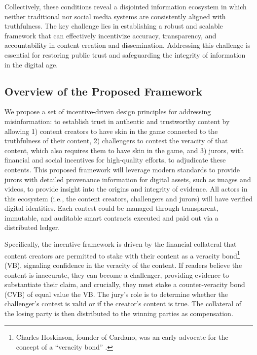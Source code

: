 \documentclass{article}
\begin{document}
Collectively, these conditions reveal a disjointed information ecosystem in which neither traditional nor social media systems are consistently aligned with truthfulness. The key challenge lies in establishing a robust and scalable framework that can effectively incentivize accuracy, transparency, and accountability in content creation and dissemination. Addressing this challenge is essential for restoring public trust and safeguarding the integrity of information in the digital age.

\subsection{Overview of the Proposed Framework}


We propose a set of incentive-driven design principles for addressing \gls{misinformation}: to establish trust in authentic and trustworthy content by allowing 1) content \gls{creators} to have skin in the game connected to the truthfulness of their content, 2) \gls{challengers} to \gls{contest} the veracity of that content, which also requires them to have skin in the game, and 3) \gls{jurors}, with financial and social incentives for high-quality efforts, to adjudicate these contents. This proposed framework will leverage modern standards \cite{c2pa} to provide jurors with detailed provenance information for digital assets, such as images and videos, to provide insight into the origins and integrity of evidence. All actors in this ecosystem (i.e., the content creators, challengers and jurors) will have verified digital identities. Each contest could be managed through transparent, immutable, and auditable smart contracts executed and paid out via a distributed ledger.

Specifically, the incentive framework is driven by the financial collateral that content creators are permitted to stake with their content as a \gls{veracity bond}\footnote{Charles Hoskinson, founder of Cardano, was an early advocate for the concept of a ``veracity bond'' \cite{charles-veracity-bond:2024}.} (VB), signaling confidence in the veracity of the content. If readers believe the content is inaccurate, they can become a challenger, providing evidence to substantiate their claim, and crucially, they must stake a \gls{counter-veracity bond} (CVB) of equal value the VB. The jury’s role is to determine whether the challenger's contest is valid or if the creator's content is true. The collateral of the losing party is then distributed to the winning parties as compensation.
\end{document}

